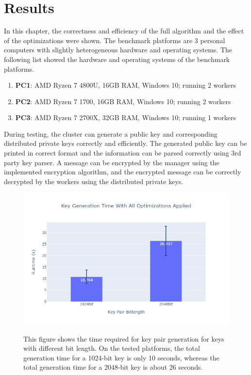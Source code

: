 \chapter{Results}

In this chapter, the correctness and efficiency of the full algorithm and the effect of the optimizations were shown. The benchmark platforms are 3 personal computers with slightly heterogeneous hardware and operating systems. The following list showed the hardware and operating systems of the benchmark platforms.
\begin{enumerate}
  \item \textbf{PC1}: AMD Ryzen 7 4800U, 16GB RAM, Windows 10; running 2 workers
  \item \textbf{PC2}: AMD Ryzen 7 1700, 16GB RAM, Windows 10; running 2 workers
  \item \textbf{PC3}: AMD Ryzen 7 2700X, 32GB RAM, Windows 10; running 1 workers
\end{enumerate}
During testing, the cluster can generate a public key and corresponding distributed private keys correctly and efficiently. The generated public key can be printed in correct format and the information can be parsed correctly using 3rd party key parser. A message can be encrypted by the manager using the implemented encryption algorithm, and the encrypted message can be correctly decrypted by the workers using the distributed private keys.

\begin{figure}[htbp]
  \centering
  \includegraphics[width=.8\textwidth]{images/key_gen_time.png}
  \label{fig:key_gen_time}
  \caption{This figure shows the time required for key pair generation for keys with different bit length. On the tested platforms, the total generation time for a 1024-bit key is only 10 seconds, whereas the total generation time for a 2048-bit key is about 26 seconds.}
\end{figure}

